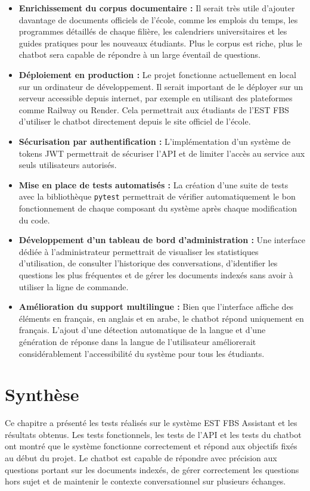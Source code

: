 \documentclass[12pt, a4paper, twoside]{report}
\begin{document}
\begin{itemize}[label=\bullet]
    \item \textbf{Enrichissement du corpus documentaire :} Il serait très utile d'ajouter davantage de documents officiels de l'école, comme les emplois du temps, les programmes détaillés de chaque filière, les calendriers universitaires et les guides pratiques pour les nouveaux étudiants. Plus le corpus est riche, plus le chatbot sera capable de répondre à un large éventail de questions.
    \item \textbf{Déploiement en production :} Le projet fonctionne actuellement en local sur un ordinateur de développement. Il serait important de le déployer sur un serveur accessible depuis internet, par exemple en utilisant des plateformes comme Railway ou Render. Cela permettrait aux étudiants de l'EST FBS d'utiliser le chatbot directement depuis le site officiel de l'école.
    \item \textbf{Sécurisation par authentification :} L'implémentation d'un système de tokens JWT permettrait de sécuriser l'API et de limiter l'accès au service aux seuls utilisateurs autorisés.
    \item \textbf{Mise en place de tests automatisés :} La création d'une suite de tests avec la bibliothèque \texttt{pytest} permettrait de vérifier automatiquement le bon fonctionnement de chaque composant du système après chaque modification du code.
    \item \textbf{Développement d'un tableau de bord d'administration :} Une interface dédiée à l'administrateur permettrait de visualiser les statistiques d'utilisation, de consulter l'historique des conversations, d'identifier les questions les plus fréquentes et de gérer les documents indexés sans avoir à utiliser la ligne de commande.
    \item \textbf{Amélioration du support multilingue :} Bien que l'interface affiche des éléments en français, en anglais et en arabe, le chatbot répond uniquement en français. L'ajout d'une détection automatique de la langue et d'une génération de réponse dans la langue de l'utilisateur améliorerait considérablement l'accessibilité du système pour tous les étudiants.
\end{itemize}

\section{Synthèse}
Ce chapitre a présenté les tests réalisés sur le système EST FBS Assistant et les résultats obtenus. Les tests fonctionnels, les tests de l'API et les tests du chatbot ont montré que le système fonctionne correctement et répond aux objectifs fixés au début du projet. Le chatbot est capable de répondre avec précision aux questions portant sur les documents indexés, de gérer correctement les questions hors sujet et de maintenir le contexte conversationnel sur plusieurs échanges.
\end{document}

